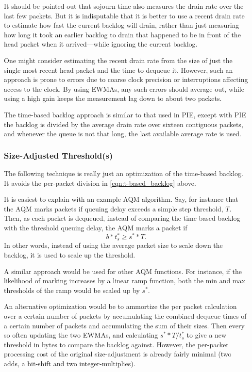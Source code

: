 It should be pointed out that sojourn time also measures the drain rate over the last few packets. But it is indisputable that it is better to use a recent drain rate to estimate how fast the current backlog will drain, rather than just measuring how long it took an earlier backlog to drain that happened to be in front of the head packet when it arrived---while ignoring the current backlog.

One might consider estimating the recent drain rate from the size of just the single most recent head packet and the time to dequeue it. However, such an approach is prone to errors due to coarse clock precision or interruptions affecting access to the clock. By using EWMAs, any such errors should average out, while using a high gain keeps the measurement lag down to about two packets.

The time-based backlog approach is similar to that used in PIE, except with PIE the backlog is divided by the average drain rate over sixteen contiguous packets, and whenever the queue is not that long, the last available average rate is used.

\subsubsection{Size-Adjusted Threshold(s)}\label{sec:time-adj_thresh}

The following technique is really just an optimization of the time-based backlog. It avoids the per-packet division in \autoref{eqn:t-based_backlog} above.

It is easiest to explain with an example AQM algorithm. Say, for instance that the AQM marks packets if queuing delay exceeds a simple step threshold, \(T\). Then, as each packet is dequeued, instead of comparing the time-based backlog with the threshold queuing delay, the AQM marks a packet if
\begin{equation}
	b * t_s^* \ge s^* * T.
\end{equation}
In other words, instead of using the average packet size to scale down the backlog, it is used to scale up the threshold.

A similar approach would be used for other AQM functions. For instance, if the likelihood of marking increases by a linear ramp function, both the min and max thresholds of the ramp would be scaled up by \(s^*\).

An alternative optimization would be to ammortize the per packet calculation over a certain number of packets by accumulating the combined dequeue times of a certain number of packets and accumulating the sum of their sizes. Then every so often updating the two EWMAs, and calculating \(s^* * T / t_s^*\) to give a new threshold in bytes to compare the backlog against. However, the per-packet processing cost of the original size-adjustment is already fairly minimal (two adds, a bit-shift and two integer-multiplies).

